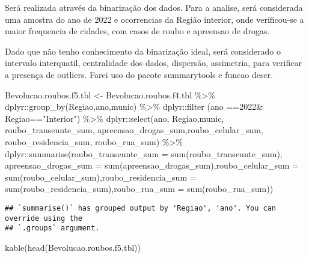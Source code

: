\documentclass[
]{article}
\newenvironment{Shaded}{\begin{snugshade}}{\end{snugshade}}
\newcommand{\AttributeTok}[1]{\textcolor[rgb]{0.77,0.63,0.00}{#1}}
\newcommand{\FunctionTok}[1]{\textcolor[rgb]{0.00,0.00,0.00}{#1}}
\newcommand{\NormalTok}[1]{#1}
\newcommand{\OtherTok}[1]{\textcolor[rgb]{0.56,0.35,0.01}{#1}}
\newcommand{\SpecialCharTok}[1]{\textcolor[rgb]{0.00,0.00,0.00}{#1}}
\newcommand{\StringTok}[1]{\textcolor[rgb]{0.31,0.60,0.02}{#1}}
\begin{document}
Será realizada através da binarização dos dados. Para a analise, será considerada uma amostra do ano de 2022 e ocorrencias da Região interior, onde verificou-se a maior frequencia de cidades, com casos de roubo e apreensao de drogas.

Dado que não tenho conhecimento da binarização ideal, será considerado o intervalo interquatil, centralidade dos dados, dispersão, assimetria, para verificar a presença de outliers. Farei uso do pacote summarytools e funcao descr.

\begin{Shaded}
\begin{Highlighting}[]
\NormalTok{Bevolucao.roubos.f5.tbl }\OtherTok{\textless{}{-}}\NormalTok{ Bevolucao.roubos.f4.tbl }\SpecialCharTok{\%\textgreater{}\%}\NormalTok{ dplyr}\SpecialCharTok{::}\FunctionTok{group\_by}\NormalTok{(Regiao,ano,munic) }\SpecialCharTok{\%\textgreater{}\%}\NormalTok{ dplyr}\SpecialCharTok{::}\FunctionTok{filter}\NormalTok{ (ano }\SpecialCharTok{==}\StringTok{\textquotesingle{}2022\textquotesingle{}}\SpecialCharTok{\&}\NormalTok{ Regiao}\SpecialCharTok{==}\StringTok{"Interior"}\NormalTok{) }\SpecialCharTok{\%\textgreater{}\%}\NormalTok{  dplyr}\SpecialCharTok{::}\FunctionTok{select}\NormalTok{(ano, Regiao,munic, roubo\_transeunte\_sum, apreensao\_drogas\_sum,roubo\_celular\_sum, roubo\_residencia\_sum, roubo\_rua\_sum) }\SpecialCharTok{\%\textgreater{}\%}\NormalTok{ dplyr}\SpecialCharTok{::}\FunctionTok{summarise}\NormalTok{(}\AttributeTok{roubo\_transeunte\_sum =} \FunctionTok{sum}\NormalTok{(roubo\_transeunte\_sum), }\AttributeTok{apreensao\_drogas\_sum =} \FunctionTok{sum}\NormalTok{(apreensao\_drogas\_sum),}\AttributeTok{roubo\_celular\_sum =} \FunctionTok{sum}\NormalTok{(roubo\_celular\_sum),}\AttributeTok{roubo\_residencia\_sum =} \FunctionTok{sum}\NormalTok{(roubo\_residencia\_sum),}\AttributeTok{roubo\_rua\_sum =} \FunctionTok{sum}\NormalTok{(roubo\_rua\_sum))}
\end{Highlighting}
\end{Shaded}

\begin{verbatim}
## `summarise()` has grouped output by 'Regiao', 'ano'. You can override using the
## `.groups` argument.
\end{verbatim}

\begin{Shaded}
\begin{Highlighting}[]
\FunctionTok{kable}\NormalTok{(}\FunctionTok{head}\NormalTok{(Bevolucao.roubos.f5.tbl))}
\end{Highlighting}
\end{Shaded}
\end{document}

